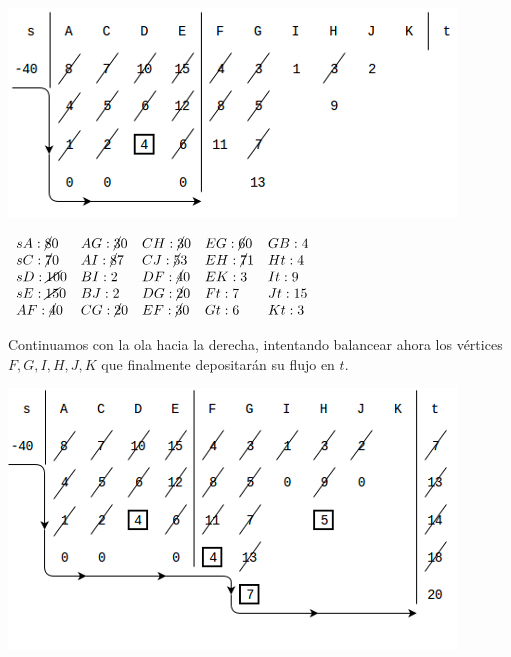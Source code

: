 \documentclass[10pt,a4paper]{article}
\begin{document}
\begin{center}

    \begin{adjustbox}{max size={\textwidth}{\textheight}}
        \includegraphics{definitions/wave_b4.jpg}
        \end{adjustbox}
    
\end{center}

\begin{center}
$\begin{array}{lllll} sA:\cancel{8} 0 & AG: \cancel{3}0 & CH: \cancel{3}0 & EG: \cancel{6}0 & GB:4\\ sC:\cancel{7 } 0 & AI: \cancel{8}7 & CJ: \cancel{5}3 & EH: \cancel{7}1 & Ht: 4\\ sD:\cancel{10} 0 & BI: 2 & DF:\cancel{4}0 & EK: 3 & It: 9\\ sE: \cancel{15} 0 &BJ: 2 & DG: \cancel{2}0 & Ft: 7 & Jt: 15\\ AF: \cancel{4}0 & CG: \cancel{2}0 & EF: \cancel{3}0 & Gt: 6 & Kt: 3\\ \end{array}$
\end{center}

Continuamos con la ola hacia la derecha, intentando balancear ahora los vértices $F, G, I, H, J, K$ que finalmente depositarán su flujo en $t$.

\begin{center}

    \begin{adjustbox}{max size={\textwidth}{\textheight}}
        \includegraphics{definitions/wave_b5.jpg}
        \end{adjustbox}
    
\end{center}
\end{document}
